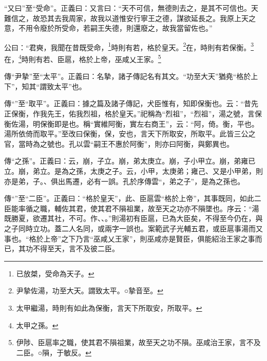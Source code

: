 {\noindent\shu{}\fzkt “又曰”至“受命”。正義曰：又言曰：“天不可信，無德則去之，是其不可信也。天難信之，故恐其去我周家，故我以道惟安行寧王之德，謀欲延長之。我原上天之意，不用令廢於所受命，若嗣王失德，則還廢之，故我當留佐也。” \par}

公曰：“君奭，我聞在昔既受命，\footnote{已放桀，受命為天子。}時則有若，格於皇天。\footnote{尹摯佐湯，功至大天。謂致太平。○摯音至。}在，時則有若保衡。\footnote{太甲繼湯，時則有如此為保衡，言天下所取安，所取平。}在，\footnote{太甲之孫。}時則有若、臣扈，格於上帝，巫咸乂王家。\footnote{伊陟、臣扈率之職，使其君不隕祖業，故至天之功不隕。巫咸治王家，言不及二臣。○隕，于敏反。}


{\noindent\zhuan{}\fzbyks 傳“尹摯”至“太平”。正義曰：名摯，諸子傳記名有其文。“功至大天”猶堯“格於上下”，知其“謂致太平”也。 \par}

{\noindent\zhuan{}\fzbyks 傳“”至“取平”。正義曰：據之篇及諸子傳記，犬臣惟有，知即保衡也。云：“昔先正保衡，作我先王，佑我烈祖，格於皇天。”祀稱為“烈祖”，“烈祖”，湯之號，言保衡佐湯，明保衡即是也。稱“實維阿衡，實左右商王”，云：“阿，倚。衡，平也。湯所依倚而取平。”至改曰保衡，保，安也，言天下所取安，所取平。此皆三公之官，當時為之號也。孔以雲“嗣王不惠於阿衡”，則亦曰阿衡，與鄭異也。 \par}

{\noindent\zhuan{}\fzbyks 傳“之孫”。正義曰：云，崩，子立。崩，弟太庚立。崩，子小甲立。崩，弟雍已立。崩，弟立。是為之孫，太庚之子。云，小甲，太庚弟；雍己、又是小甲弟，則亦是弟，子。、俱出馬遷，必有一誤。孔於序傳雲“，弟之子”，是為之孫也。 \par}

{\noindent\zhuan{}\fzbyks 傳“”至“二臣”。正義曰：“格於皇天”，此、臣扈雲“格於上帝”，其事既同，如此二臣能率循之職，輔佐其君，使其君不隕祖業，故至天之功亦不隕墜也。序云：“湯既勝夏，欲遷其社，不可。作、、。”則湯初有臣扈，已為大臣矣，不得至今仍在，與之子同時立功。蓋二人名同，或兩字一誤也。案範武子光輔五君，或臣扈事湯而又事也。“格於上帝”之下乃言“巫咸乂王家”，則巫咸亦是賢臣，俱能紹治王家之事而已，其功不得至天，言不及彼二臣。 \par}

